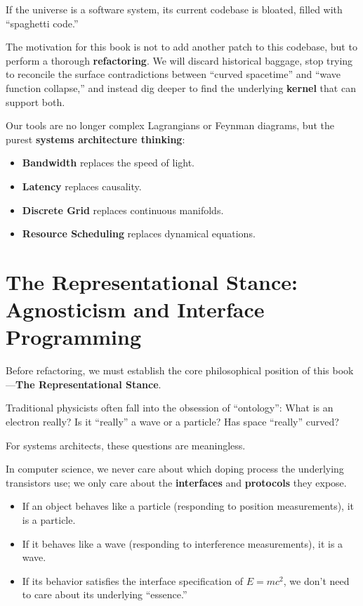 \documentclass[11pt,a4paper,twoside]{book}
\begin{document}
If the universe is a software system, its current codebase is bloated, filled with ``spaghetti code.''

The motivation for this book is not to add another patch to this codebase, but to perform a thorough \textbf{refactoring}. We will discard historical baggage, stop trying to reconcile the surface contradictions between ``curved spacetime'' and ``wave function collapse,'' and instead dig deeper to find the underlying \textbf{kernel} that can support both.

Our tools are no longer complex Lagrangians or Feynman diagrams, but the purest \textbf{systems architecture thinking}:

\begin{itemize}
\item \textbf{Bandwidth} replaces the speed of light.

\item \textbf{Latency} replaces causality.

\item \textbf{Discrete Grid} replaces continuous manifolds.

\item \textbf{Resource Scheduling} replaces dynamical equations.
\end{itemize}

\section{The Representational Stance: Agnosticism and Interface Programming}

Before refactoring, we must establish the core philosophical position of this book---\textbf{The Representational Stance}.

Traditional physicists often fall into the obsession of ``ontology'': What is an electron really? Is it ``really'' a wave or a particle? Has space ``really'' curved?

For systems architects, these questions are meaningless.

In computer science, we never care about which doping process the underlying transistors use; we only care about the \textbf{interfaces} and \textbf{protocols} they expose.

\begin{itemize}
\item If an object behaves like a particle (responding to position measurements), it is a particle.

\item If it behaves like a wave (responding to interference measurements), it is a wave.

\item If its behavior satisfies the interface specification of $E=mc^2$, we don't need to care about its underlying ``essence.''
\end{itemize}
\end{document}
